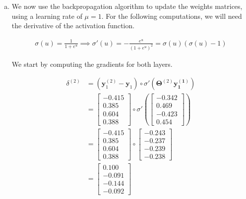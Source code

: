 \documentclass[a4paper, 10pt, twoside]{article}
\begin{document}
\begin{enumerate}[a)]
	\item We now use the backpropagation algorithm to update the weights matrices, using a learning rate of $\mu = 1$.
	      For the following computations, we will need the derivative of the activation function.

	      \begin{align*}
		      \sigma(u) = \frac{1}{1+e^u} \implies \sigma'(u) = - \frac{e^u}{\left(1+e^u\right)^2} = \sigma(u)(\sigma(u)-1)
	      \end{align*}

	      We start by computing the gradients for both layers.

	      \begin{align*}
		      \delta^{(2)}
		       & = \left(\bm{y}_1^{(2)} - \bm{y}_1\right) \circ \sigma' \left(\bm{\Theta}^{(2)}\bm{y_1^{(1)}}\right) \\
		       & =
		      \begin{bmatrix}
			      -0.415 \\ 0.385 \\ 0.604 \\ 0.388
		      \end{bmatrix} \circ
		      \sigma'
		      \left(
		      \begin{bmatrix}
				      -0.342 \\ 0.469 \\ -0.423 \\ 0.454
			      \end{bmatrix}
		      \right)                                                                                                \\
		       & =
		      \begin{bmatrix}
			      -0.415 \\ 0.385 \\ 0.604 \\ 0.388
		      \end{bmatrix} \circ
		      \begin{bmatrix}
			      -0.243 \\ -0.237 \\ -0.239 \\ -0.238
		      \end{bmatrix}                                                                             \\
		       & =
		      \begin{bmatrix}
			      0.100 \\ -0.091 \\ -0.144 \\ -0.092
		      \end{bmatrix}
	      \end{align*}


\end{enumerate}
\end{document}
